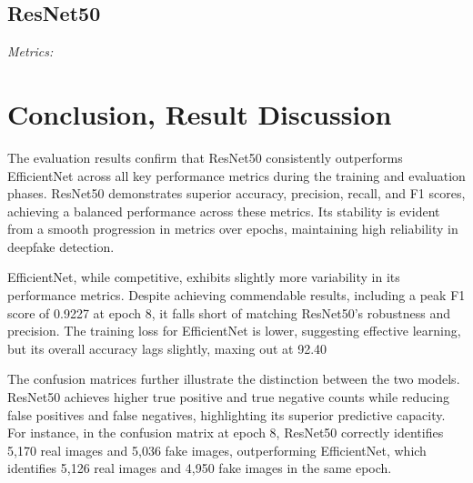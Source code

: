 \documentclass[conference]{IEEEtran}
\begin{document}
\subsection*{ResNet50}
\textit{Metrics:}  
\begin{center}
\end{center} 

\section*{Conclusion, Result Discussion}
The evaluation results confirm that ResNet50 consistently outperforms EfficientNet across all key performance metrics during the training and evaluation phases. ResNet50 demonstrates superior accuracy, precision, recall, and F1 scores, achieving a balanced performance across these metrics. Its stability is evident from a smooth progression in metrics over epochs, maintaining high reliability in deepfake detection.

EfficientNet, while competitive, exhibits slightly more variability in its performance metrics. Despite achieving commendable results, including a peak F1 score of 0.9227 at epoch 8, it falls short of matching ResNet50's robustness and precision. The training loss for EfficientNet is lower, suggesting effective learning, but its overall accuracy lags slightly, maxing out at 92.40%

The confusion matrices further illustrate the distinction between the two models. ResNet50 achieves higher true positive and true negative counts while reducing false positives and false negatives, highlighting its superior predictive capacity. For instance, in the confusion matrix at epoch 8, ResNet50 correctly identifies 5,170 real images and 5,036 fake images, outperforming EfficientNet, which identifies 5,126 real images and 4,950 fake images in the same epoch.
\end{document}
